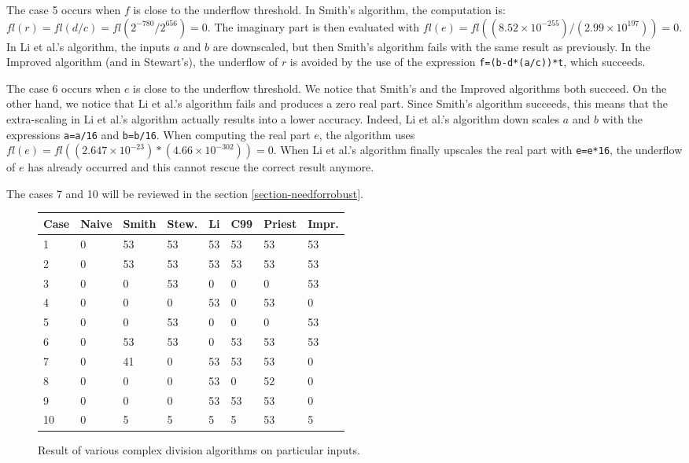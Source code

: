 \documentclass{paper}
\newcommand{\scivar}[1]{\texttt{#1}}
\begin{document}
The case 5 occurs when $f$ is close to the underflow threshold. 
In Smith's algorithm, the computation is: $fl(r)=fl(d/c)=fl(2^{-780}/2^{656})=0$. 
The imaginary part is then evaluated with 
$fl(e) = fl((8.52\times 10^{-255}) / (2.99\times 10^{197})) = 0$. 
In Li et al.'s algorithm, the inputs $a$ and $b$ are downscaled, but then Smith's 
algorithm fails with the same result as previously. 
In the Improved algorithm (and in Stewart's), the underflow of $r$ is avoided 
by the use of the expression \scivar{f=(b-d*(a/c))*t}, which succeeds.

The case 6 occurs when $e$ is close to the underflow threshold. 
We notice that Smith's and the Improved algorithms both succeed. 
On the other hand, we notice that Li et al.'s algorithm fails and produces a 
zero real part. 
Since Smith's algorithm succeeds, this means that the extra-scaling 
in Li et al.'s algorithm actually results into a lower accuracy. 
Indeed, Li et al.'s algorithm down scales $a$ and $b$ with the expressions 
\scivar{a=a/16} and \scivar{b=b/16}. 
When computing the real part $e$, the algorithm uses 
$fl(e) = fl((2.647\times 10^{-23}) * (4.66\times 10^{-302})) = 0$.
When Li et al.'s algorithm finally upscales the real part with \scivar{e=e*16}, the underflow 
of $e$ has already occurred and this cannot rescue the correct result anymore. 

The cases 7 and 10 will be reviewed in the section \ref{section-needforrobust}.

\begin{figure}
\caption{Result of various complex division algorithms on particular inputs.}
\label{fig-compdiv-diffcases}
\begin{center}
\begin{tabular}{l|lllllll@{}}
\bf{Case} & \bf{Naive} & \bf{Smith} & \bf{Stew.} & \bf{Li}   & \bf{C99}  & \bf{Priest} & \bf{Impr.} \\
\hline
1  &   0  &   53  &  53  &  53  &  53  &  53  &   53   \\
2  &   0  &   53  &  53  &  53  &  53  &  53  &   53   \\  
3  &   0  &   0   &  53  &  0   &  0   &  0   &   53   \\    
4  &   0  &   0   &  0   &  53  &  0   &  53  &   0    \\    
5  &   0  &   0   &  53  &  0   &  0   &  0   &   53   \\    
6  &   0  &   53  &  53  &  0   &  53  &  53  &   53   \\    
7  &   0  &   41  &  0   &  53  &  53  &  53  &   0    \\    
8  &   0  &   0   &  0   &  53  &  0   &  52  &   0    \\    
9  &   0  &   0   &  0   &  53  &  53  &  53  &   0    \\    
10 &   0  &   5   &  5   &  5   &  5   &  53  &   5    \\    
\end{tabular}
\end{center}
\end{figure}
\end{document}
